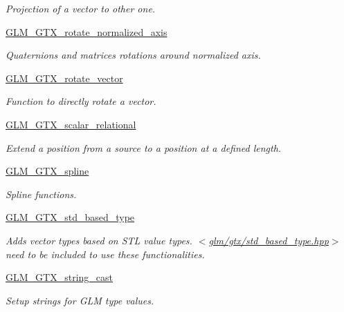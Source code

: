 \begin{DoxyCompactItemize}
\begin{DoxyCompactList}\small\item\em Projection of a vector to other one. \end{DoxyCompactList}\item 
\mbox{\hyperlink{group__gtx__rotate__normalized__axis}{G\+L\+M\+\_\+\+G\+T\+X\+\_\+rotate\+\_\+normalized\+\_\+axis}}
\begin{DoxyCompactList}\small\item\em Quaternions and matrices rotations around normalized axis. \end{DoxyCompactList}\item 
\mbox{\hyperlink{group__gtx__rotate__vector}{G\+L\+M\+\_\+\+G\+T\+X\+\_\+rotate\+\_\+vector}}
\begin{DoxyCompactList}\small\item\em Function to directly rotate a vector. \end{DoxyCompactList}\item 
\mbox{\hyperlink{group__gtx__scalar__relational}{G\+L\+M\+\_\+\+G\+T\+X\+\_\+scalar\+\_\+relational}}
\begin{DoxyCompactList}\small\item\em Extend a position from a source to a position at a defined length. \end{DoxyCompactList}\item 
\mbox{\hyperlink{group__gtx__spline}{G\+L\+M\+\_\+\+G\+T\+X\+\_\+spline}}
\begin{DoxyCompactList}\small\item\em Spline functions. \end{DoxyCompactList}\item 
\mbox{\hyperlink{group__gtx__std__based__type}{G\+L\+M\+\_\+\+G\+T\+X\+\_\+std\+\_\+based\+\_\+type}}
\begin{DoxyCompactList}\small\item\em Adds vector types based on S\+TL value types. $<$\mbox{\hyperlink{std__based__type_8hpp}{glm/gtx/std\+\_\+based\+\_\+type.\+hpp}}$>$ need to be included to use these functionalities. \end{DoxyCompactList}\item 
\mbox{\hyperlink{group__gtx__string__cast}{G\+L\+M\+\_\+\+G\+T\+X\+\_\+string\+\_\+cast}}
\begin{DoxyCompactList}\small\item\em Setup strings for G\+LM type values. \end{DoxyCompactList}\item 

\end{DoxyCompactItemize}

